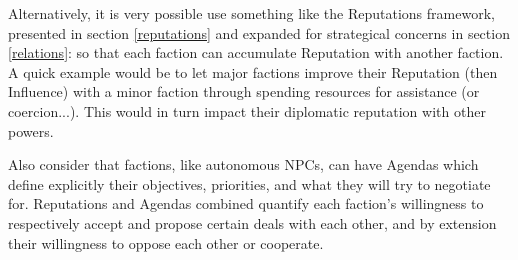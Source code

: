 Alternatively, it is very possible use something like the Reputations framework, presented in section \ref{reputations} and expanded for strategical concerns in section \ref{relations}: so that each faction can accumulate Reputation with another faction. A quick example would be to let major factions improve their Reputation (then Influence) with a minor faction through spending resources for assistance (or coercion...). This would in turn impact their diplomatic reputation with other powers.

Also consider that factions, like autonomous NPCs, can have Agendas which define explicitly their objectives, priorities, and what they will try to negotiate for. Reputations and Agendas combined quantify each faction's willingness to respectively accept and propose certain deals with each other, and by extension their willingness to oppose each other or cooperate.